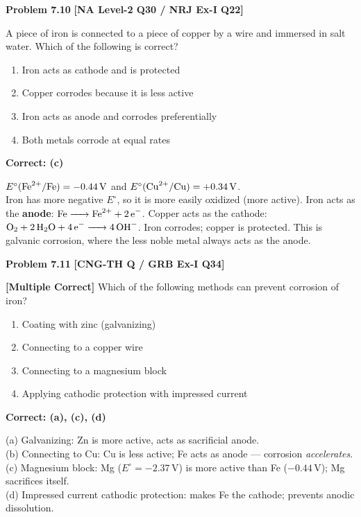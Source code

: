 \begin{problembox}
\textbf{Problem 7.10} \hfill \textbf{[NA Level-2 Q30 / NRJ Ex-I Q22]}

A piece of iron is connected to a piece of copper by a wire and immersed in salt water. Which of the following is correct?

\begin{enumerate}[label=(\alph*)]
    \item Iron acts as cathode and is protected
    \item Copper corrodes because it is less active
    \item Iron acts as anode and corrodes preferentially
    \item Both metals corrode at equal rates
\end{enumerate}
\end{problembox}
\begin{solution}
\textbf{Correct: (c)}

$E^\circ(\ce{Fe^2+/Fe}) = -0.44\,\text{V}$ and $E^\circ(\ce{Cu^2+/Cu}) = +0.34\,\text{V}$.\\
Iron has more negative $E^\circ$, so it is more easily oxidized (more active). Iron acts as the \textbf{anode}: $\ce{Fe -> Fe^2+ + 2e-}$. Copper acts as the cathode: $\ce{O2 + 2H2O + 4e- -> 4OH-}$. Iron corrodes; copper is protected. This is galvanic corrosion, where the less noble metal always acts as the anode.
\end{solution}

\begin{problembox}
\textbf{Problem 7.11} \hfill \textbf{[CNG-TH Q / GRB Ex-I Q34]}

\textbf{[Multiple Correct]} Which of the following methods can prevent corrosion of iron?

\begin{enumerate}[label=(\alph*)]
    \item Coating with zinc (galvanizing)
    \item Connecting to a copper wire
    \item Connecting to a magnesium block
    \item Applying cathodic protection with impressed current
\end{enumerate}
\end{problembox}
\begin{solution}
\textbf{Correct: (a), (c), (d)}

(a) Galvanizing: Zn is more active, acts as sacrificial anode. \checkmark\\
(b) Connecting to Cu: Cu is less active; Fe acts as anode --- corrosion \textit{accelerates}. \texttimes\\
(c) Magnesium block: Mg ($E^\circ = -2.37\,\text{V}$) is more active than Fe ($-0.44\,\text{V}$); Mg sacrifices itself. \checkmark\\
(d) Impressed current cathodic protection: makes Fe the cathode; prevents anodic dissolution. \checkmark
\end{solution}

